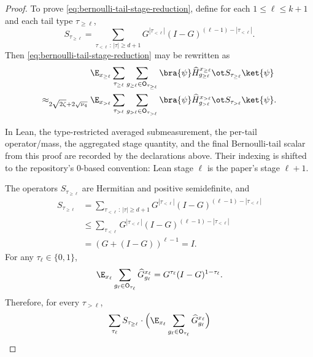 \begin{proof}
	To prove \ref{eq:bernoulli-tail-stage-reduction}, define for each $1\le \ell \le k+1$ and each tail type $\tau_{\ge \ell}$,
	\begin{equation}\label{eq:S-def}
		S_{\tau_{\ge \ell}}
		=
		\sum_{\tau_{<\ell}\,:\,|\tau|\ge d+1}
		G^{|\tau_{<\ell}|}(I-G)^{(\ell-1)-|\tau_{<\ell}|}.
	\end{equation}
	Then \ref{eq:bernoulli-tail-stage-reduction} may be rewritten as
	\begin{align}
		                                         & \E_{x_{\ge \ell}} \sum_{\tau_{\ge \ell}} \sum_{g_{\ge \ell}\in \mathsf O_{\tau_{\ge \ell}}}
		\bra{\psi} \widehat H_{g_{\ge \ell}}^{x_{\ge \ell}} \ot S_{\tau_{\ge \ell}} \ket{\psi}\nonumber                                        \\
		\approx_{2\sqrt{2\zeta}+2\sqrt{\nu_4}}{} &
		\E_{x_{>\ell}} \sum_{\tau_{>\ell}} \sum_{g_{>\ell}\in \mathsf O_{\tau_{>\ell}}}
		\bra{\psi} \widehat H_{g_{>\ell}}^{x_{>\ell}} \ot S_{\tau_{>\ell}} \ket{\psi}.
		\label{eq:bernoulli-tail-stage-reduction-expanded}
	\end{align}
	\begin{remark}
		In Lean, the type-restricted averaged submeasurement, the per-tail operator/mass, the aggregated stage quantity, and the final Bernoulli-tail scalar from this proof are recorded by the declarations above. Their indexing is shifted to the repository's 0-based convention: Lean stage $\ell$ is the paper's stage $\ell+1$.
	\end{remark}
	The operators $S_{\tau_{\ge \ell}}$ are Hermitian and positive semidefinite, and
	\begin{align}
		S_{\tau_{\ge \ell}}
		 & =
		\sum_{\tau_{<\ell}\,:\,|\tau|\ge d+1}
		G^{|\tau_{<\ell}|}(I-G)^{(\ell-1)-|\tau_{<\ell}|}\nonumber \\
		 & \le
		\sum_{\tau_{<\ell}}
		G^{|\tau_{<\ell}|}(I-G)^{(\ell-1)-|\tau_{<\ell}|}\nonumber \\
		 & =
		(G+(I-G))^{\ell-1}
		= I.
		\label{eq:S-bound}
	\end{align}
	For any $\tau_\ell \in \{0,1\}$,
	\begin{equation}\label{eq:explicit-formula-for-G-expectation}
		\E_{x_\ell} \sum_{g_\ell \in \mathsf O_{\tau_\ell}} \widehat G_{g_\ell}^{x_\ell}
		=
		G^{\tau_\ell}(I-G)^{1-\tau_\ell}.
	\end{equation}
	Therefore, for every $\tau_{>\ell}$,
	\begin{align}
		\sum_{\tau_\ell}
		S_{\tau_{\ge \ell}}
		\cdot
		\Bigl(\E_{x_\ell} \sum_{g_\ell \in \mathsf O_{\tau_\ell}} \widehat G_{g_\ell}^{x_\ell}\Bigr)

\end{align}
\end{proof}
